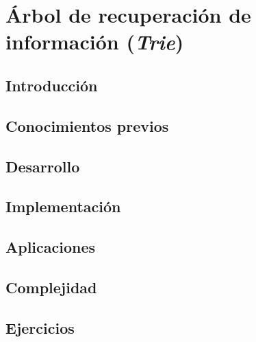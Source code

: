 \chapter{Árbol de recuperación de información (\emph{Trie})}
\section{Introducción}

\section{Conocimientos previos}

\section{Desarrollo}

\section{Implementación}

\section{Aplicaciones}

\section{Complejidad}

\section{Ejercicios}
